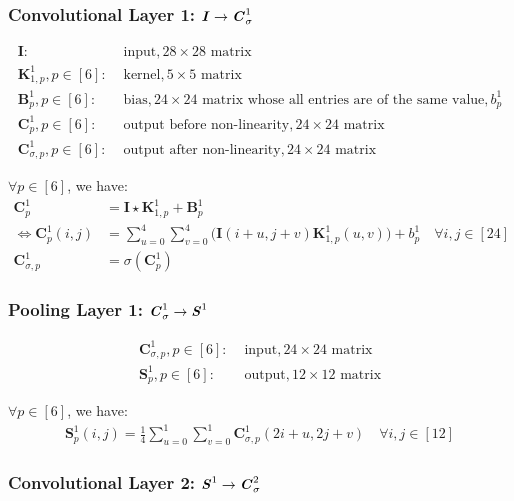 \documentclass[12pt]{article}
\begin{document}
\subsubsection{Convolutional Layer 1: $\textbf{\textit{I}} \rightarrow \textbf{\textit{C}}^1_\sigma$}

\begin{align*}
    \bm{I}:& \text{ input}, 28 \times 28 \text{ matrix}\\
    \bm{K}^1_{1, p}, p \in [6]:& \text{ kernel}, 5 \times 5 \text{ matrix}\\
    \bm{B}^1_p, p \in [6]:& \text{ bias}, 24 \times 24 \text{ matrix whose all entries are of the same value}, b^1_p\\
    \bm{C}^1_p, p \in [6]:& \text{ output before non-linearity}, 24 \times 24 \text{ matrix}\\
    \bm{C}^1_{\sigma, p}, p \in [6]:& \text{ output after non-linearity}, 24 \times 24 \text{ matrix}
\end{align*}

$\forall p \in [6]$, we have:
\begin{align*}
    \bm{C}^1_p &= \bm{I} \star \bm{K}^1_{1, p} + \bm{B}^1_p\\
    \Leftrightarrow \bm{C}^1_p(i, j) &= \sum_{u = 0}^4\sum_{v = 0}^4\Big(\bm{I}(i + u, j + v)\bm{K}^1_{1,p}(u, v)\Big) + b^1_p \quad \forall i, j \in [24]\\
    \bm{C}^1_{\sigma, p} &= \sigma(\bm{C}^1_p)
\end{align*}

\subsubsection{Pooling Layer 1: $\textbf{\textit{C}}^1_\sigma \rightarrow \textbf{\textit{S}}^1$}

\begin{align*}
    \bm{C}^1_{\sigma, p}, p \in [6]:& \text{ input}, 24 \times 24 \text{ matrix}\\
    \bm{S}^1_p, p \in [6]:& \text{ output}, 12 \times 12 \text{ matrix}
\end{align*}

$\forall p \in [6]$, we have:
\begin{align*}
    \bm{S}^1_p(i, j) = \frac{1}{4}\sum_{u = 0}^1\sum_{v = 0}^1\bm{C}^1_{\sigma, p}(2i + u, 2j + v) \quad \forall i, j \in [12]
\end{align*}

\subsubsection{Convolutional Layer 2: $\textbf{\textit{S}}^1 \rightarrow \textbf{\textit{C}}^2_\sigma$}
\end{document}
